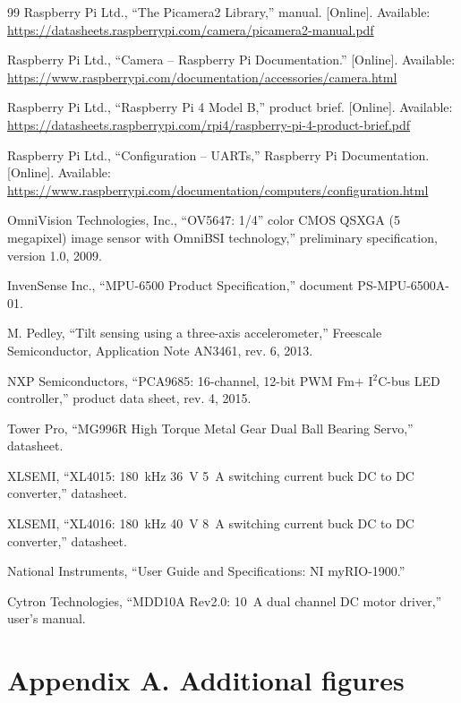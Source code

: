 \documentclass[11pt,letterpaper]{article}
\begin{document}
\begin{thebibliography}{99}
Raspberry Pi Ltd.,
``The Picamera2 Library,'' manual. [Online]. Available:
\url{https://datasheets.raspberrypi.com/camera/picamera2-manual.pdf}

Raspberry Pi Ltd.,
``Camera -- Raspberry Pi Documentation.'' [Online]. Available:
\url{https://www.raspberrypi.com/documentation/accessories/camera.html}

Raspberry Pi Ltd.,
``Raspberry Pi 4 Model B,'' product brief. [Online]. Available:
\url{https://datasheets.raspberrypi.com/rpi4/raspberry-pi-4-product-brief.pdf}

Raspberry Pi Ltd.,
``Configuration -- UARTs,'' Raspberry Pi Documentation. [Online]. Available:
\url{https://www.raspberrypi.com/documentation/computers/configuration.html}

OmniVision Technologies, Inc.,
``OV5647: 1/4'' color CMOS QSXGA (5 megapixel) image sensor with
OmniBSI technology,'' preliminary specification, version 1.0, 2009.

InvenSense Inc.,
``MPU-6500 Product Specification,'' document PS-MPU-6500A-01.

M. Pedley,
``Tilt sensing using a three-axis accelerometer,''
Freescale Semiconductor, Application Note AN3461, rev. 6, 2013.

NXP Semiconductors,
``PCA9685: 16-channel, 12-bit PWM Fm+ I$^2$C-bus LED controller,''
product data sheet, rev. 4, 2015.

Tower Pro,
``MG996R High Torque Metal Gear Dual Ball Bearing Servo,'' datasheet.

XLSEMI,
``XL4015: 180~kHz 36~V 5~A switching current buck DC to DC converter,''
datasheet.

XLSEMI,
``XL4016: 180~kHz 40~V 8~A switching current buck DC to DC converter,''
datasheet.

National Instruments,
``User Guide and Specifications: NI myRIO-1900.''

Cytron Technologies,
``MDD10A Rev2.0: 10~A dual channel DC motor driver,'' user's manual.

\end{thebibliography}

\section*{Appendix A. Additional figures}
\setcounter{figure}{0}
\renewcommand{\thefigure}{A.\arabic{figure}}
\end{document}
